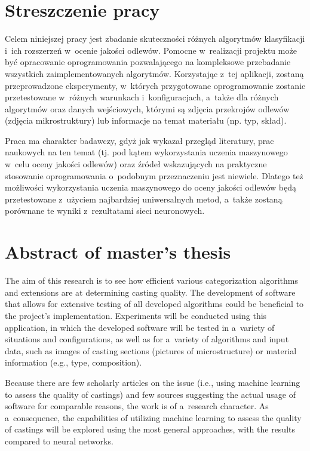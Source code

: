 \section*{Streszczenie pracy}

Celem niniejszej pracy jest zbadanie skuteczności różnych algorytmów klasyfikacji i~ich rozszerzeń w~ocenie jakości odlewów. Pomocne w~realizacji projektu może być opracowanie oprogramowania pozwalającego na kompleksowe przebadanie wszystkich zaimplementowanych algorytmów. Korzystając z~tej aplikacji, zostaną przeprowadzone eksperymenty, w~których przygotowane oprogramowanie zostanie przetestowane w~różnych warunkach i~konfiguracjach, a~także dla różnych algorytmów oraz danych wejściowych, którymi są zdjęcia przekrojów odlewów (zdjęcia mikrostruktury) lub informacje na temat materiału (np. typ, skład). 

Praca ma charakter badawczy, gdyż jak wykazał przegląd literatury, prac naukowych na ten temat (tj. pod kątem wykorzystania uczenia maszynowego w~celu oceny jakości odlewów) oraz źródeł wskazujących na praktyczne stosowanie oprogramowania o~podobnym przeznaczeniu jest niewiele. Dlatego też możliwości wykorzystania uczenia maszynowego do oceny jakości odlewów będą przetestowane z~użyciem najbardziej uniwersalnych metod, a~także zostaną porównane te wyniki z~rezultatami sieci neuronowych.


\section*{Abstract of master's thesis}

The aim of this research is to see how efficient various categorization algorithms and extensions are at determining casting quality. The development of software that allows for extensive testing of all developed algorithms could be beneficial to the project's implementation. Experiments will be conducted using this application, in which the developed software will be tested in a~variety of situations and configurations, as well as for a~variety of algorithms and input data, such as images of casting sections (pictures of microstructure) or material information (e.g., type, composition).

Because there are few scholarly articles on the issue (i.e., using machine learning to assess the quality of castings) and few sources suggesting the actual usage of software for comparable reasons, the work is of a~research character. As a~consequence, the capabilities of utilizing machine learning to assess the quality of castings will be explored using the most general approaches, with the results compared to neural networks.

















